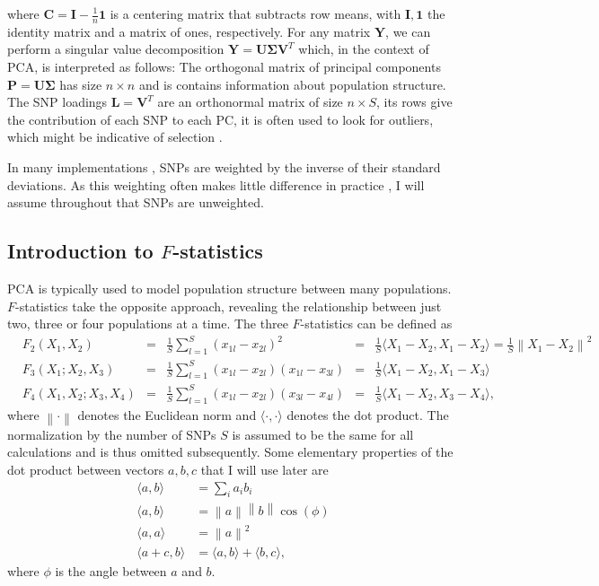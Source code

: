 \documentclass[12pt,fullpage, a4paper]{article}
\newcommand{\norm}[1]{\left\lVert#1\right\rVert}
\newcommand{\normsq}[1]{\left\lVert#1\right\rVert^2}
\newcommand{\MC}{\mathbf{C}} %
\newcommand{\MY}{\mathbf{Y}} %
\newcommand{\MP}{\mathbf{P}} %
\newcommand{\ML}{\mathbf{L}} %
\newcommand{\MSINGULAR}{\mathbf{\Sigma}} %
\begin{document}
	where $\MC = \mathbf{I} -\frac{1}{n}\mathbf{1}$ is a centering matrix that subtracts row means, with $\mathbf{I}, \mathbf{1}$  the identity matrix and a matrix of ones, respectively. For any matrix $\MY$, we can perform a singular value decomposition $\MY = \mathbf{U}\MSINGULAR\mathbf{V}^T$ which, in the context of PCA, is interpreted as follows: The orthogonal matrix of principal components $\MP=\mathbf{U}\MSINGULAR$ has size $n \times n$ and is contains information about population structure. The SNP loadings $\ML=\mathbf{V}^T$ are an orthonormal matrix of size $n \times S$, its rows give the contribution of each SNP to each PC, it is often used to look for outliers, which might be indicative of selection \citep[e.g][]{francois2010}.
	
	In many  implementations \citep[e.g.][]{patterson2006}, SNPs are weighted by
    the inverse of their standard deviations. As this weighting often makes little
    difference in practice \citep{mcvean2009}, I will assume throughout that SNPs
    are unweighted.

\subsection{Introduction to $F$-statistics}
PCA is typically used to model population structure between many populations. $F$-statistics take the opposite approach, revealing the relationship between just two,  three or four populations at a time. The three $F$-statistics can be defined as 
\begin{subequations}
	\begin{align}
	&F_2(X_1, X_2) &=& \frac{1}{S}\sum_{l=1}^S(x_{1l} - x_{2l})^2
	&=& \frac{1}{S}\langle X_1 - X_2, X_1 - X_2 \rangle = \frac{1}{S}\normsq{X_1-  X_2}\\
	&F_3(X_1; X_2, X_3) &=& \frac{1}{S}\sum_{l=1}^S(x_{1l} - x_{2l})(x_{1l} - x_{3l}) &=& \frac{1}{S}\langle X_1 - X_2, X_1 - X_3 \rangle\\	
	&F_4(X_1, X_2; X_3, X_4) &=& \frac{1}{S}\sum_{l=1}^S(x_{1l} - x_{2l})(x_{3l} - x_{4l}) &=& \frac{1}{S}\langle X_1 - X_2, X_3 - X_4 \rangle	\text{,}
	\end{align}
\end{subequations}
where $\norm{\cdot}$ denotes the Euclidean norm and $\langle \cdot, \cdot \rangle$ denotes the dot product. The normalization by the number of SNPs $S$ is assumed to be the same for all calculations and is thus omitted subsequently. Some elementary properties of the dot product between vectors $a, b, c$ that I will use later are
\begin{subequations}
\begin{align}
\langle a, b \rangle &= \sum_i a_ib_i\\
\langle a, b \rangle &= \norm{a}\norm{b}\cos(\phi)\\
\langle a, a \rangle &= \normsq{a}\\
\langle a + c, b \rangle &= \langle a, b \rangle + \langle b, c \rangle,
\end{align}
\end{subequations}
where $\phi$ is the angle between $a$ and $b$. 
\end{document}
